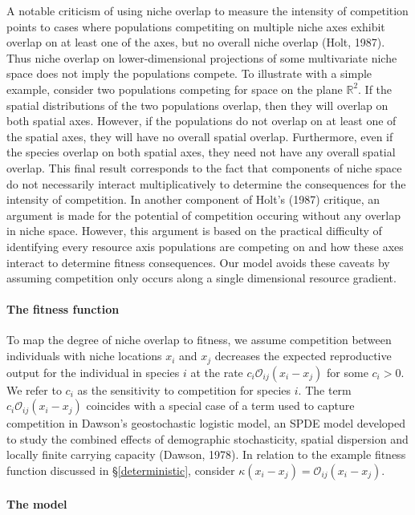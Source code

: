 \documentclass[]{elsarticle} %
\begin{document}
A notable criticism of using niche overlap to measure the intensity of
competition points to cases where populations competiting on multiple
niche axes exhibit overlap on at least one of the axes, but no overall
niche overlap (Holt, 1987). Thus niche overlap on lower-dimensional
projections of some multivariate niche space does not imply the
populations compete. To illustrate with a simple example, consider two
populations competing for space on the plane \(\mathbb{R}^2\). If the
spatial distributions of the two populations overlap, then they will
overlap on both spatial axes. However, if the populations do not overlap
on at least one of the spatial axes, they will have no overall spatial
overlap. Furthermore, even if the species overlap on both spatial axes,
they need not have any overall spatial overlap. This final result
corresponds to the fact that components of niche space do not
necessarily interact multiplicatively to determine the consequences for
the intensity of competition. In another component of Holt's (1987)
critique, an argument is made for the potential of competition occuring
without any overlap in niche space. However, this argument is based on
the practical difficulty of identifying every resource axis populations
are competing on and how these axes interact to determine fitness
consequences. Our model avoids these caveats by assuming competition
only occurs along a single dimensional resource gradient.

\paragraph{The fitness function}

To map the degree of niche overlap to fitness, we assume competition
between individuals with niche locations \(x_i\) and \(x_j\) decreases
the expected reproductive output for the individual in species \(i\) at
the rate \(c_i\mathcal{O}_{ij}(x_i-x_j)\) for some \(c_i>0\). We refer
to \(c_i\) as the sensitivity to competition for species \(i\). The term
\(c_i\mathcal{O}_{ij}(x_i-x_j)\) coincides with a special case of a term
used to capture competition in Dawson's geostochastic logistic model, an
SPDE model developed to study the combined effects of demographic
stochasticity, spatial dispersion and locally finite carrying capacity
(Dawson, 1978). In relation to the example fitness function discussed in
\S\ref{deterministic}, consider
\(\kappa(x_i-x_j)=\mathcal{O}_{ij}(x_i-x_j)\).

\paragraph{The model}
\end{document}
